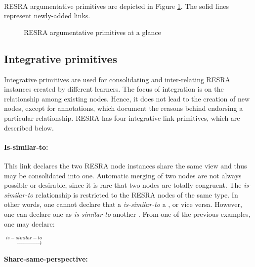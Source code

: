 \paragraph{}RESRA argumentative primitives are depicted in Figure
\ref{fig:arg-resra}. The solid lines represent newly-added links.

\begin{figure}[htb]
  \caption{RESRA argumentative primitives at a glance}
  \label{fig:arg-resra}
\end{figure}


\subsection{Integrative primitives}
\label{sec:integrative primitives}

Integrative primitives are used for consolidating and inter-relating RESRA
instances created by different learners. The focus of integration is on the
relationship among existing nodes. Hence, it does not lead to the creation
of new nodes, except for annotations, which document the reasons behind
endorsing a particular relationship. RESRA has four integrative link
primitives, which are described below.

\paragraph{Is-similar-to:}

This link declares the two RESRA node instances share the same view and
thus may be consolidated into one. Automatic merging of two nodes are not
always possible or desirable, since it is rare that two nodes are totally
congruent. The {\it is-similar-to\/} relationship is restricted to the
RESRA nodes of the same type. In other words, one cannot declare that a
 {\it is-similar-to\/} a , or vice
versa.  However, one can declare one  as {\it
is-similar-to\/} another . From one of the
previous examples, one may declare:

\indent {} \(
  \stackrel{is-similar-to}{\longrightarrow} \) 

\paragraph{Share-same-perspective:}
  
